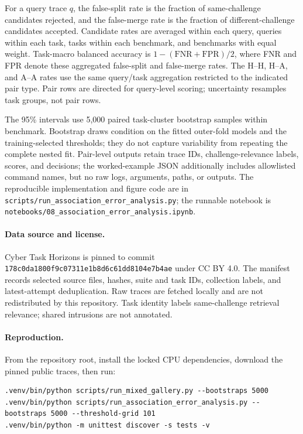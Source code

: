 For a query trace $q$, the false-split rate is the fraction of same-challenge candidates rejected, and the false-merge rate is the fraction of different-challenge candidates accepted. Candidate rates are averaged within each query, queries within each task, tasks within each benchmark, and benchmarks with equal weight. Task-macro balanced accuracy is $1 - (\mathrm{FNR}+\mathrm{FPR})/2$, where FNR and FPR denote these aggregated false-split and false-merge rates. The H--H, H--A, and A--A rates use the same query/task aggregation restricted to the indicated pair type. Pair rows are directed for query-level scoring; uncertainty resamples task groups, not pair rows.

The 95\% intervals use 5,000 paired task-cluster bootstrap samples within benchmark. Bootstrap draws condition on the fitted outer-fold models and the training-selected thresholds; they do not capture variability from repeating the complete nested fit. Pair-level outputs retain trace IDs, challenge-relevance labels, scores, and decisions; the worked-example JSON additionally includes allowlisted command names, but no raw logs, arguments, paths, or outputs. The reproducible implementation and figure code are in \texttt{scripts/run\_association\_error\_analysis.py}; the runnable notebook is \texttt{notebooks/08\_association\_error\_analysis.ipynb}.

\paragraph{Data source and license.} Cyber Task Horizons is pinned to commit \texttt{178c0da1800f9c07311e1b8d6c61dd8104e7b4ae} under CC BY 4.0. The manifest records selected source files, hashes, suite and task IDs, collection labels, and latest-attempt deduplication. Raw traces are fetched locally and are not redistributed by this repository. Task identity labels same-challenge retrieval relevance; shared intrusions are not annotated.

\paragraph{Reproduction.} From the repository root, install the locked CPU dependencies, download the pinned public traces, then run:

\begin{verbatim}
.venv/bin/python scripts/run_mixed_gallery.py --bootstraps 5000
.venv/bin/python scripts/run_association_error_analysis.py --bootstraps 5000 --threshold-grid 101
.venv/bin/python -m unittest discover -s tests -v
\end{verbatim}

